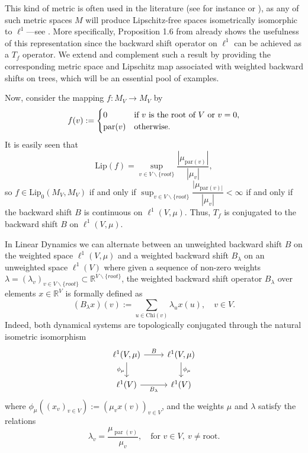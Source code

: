 \documentclass[12pt,english]{amsart}
\numberwithin{equation}{section}
\theoremstyle{plain}
\theoremstyle{definition}
\def\RR{\mathbb{R}}
\def\pare{\text{par}}
\def\chil{\text{Chi}}
\def\lip{ \text{Lip}}
\begin{document}
This kind of metric is often used in the literature (see for instance \cite{ACP21} or \cite{Tap24}), as any of such metric spaces $M$ will produce Lipschitz-free spaces isometrically isomorphic to $\ell^1$---see \cite{God10}. More specifically, Proposition 1.6 from \cite{ACP21} already shows the usefulness of this representation since the backward shift operator on $\ell^1$ can be achieved as a $T_f$ operator. We extend and complement such a result by providing the corresponding metric space and Lipschitz map associated with weighted backward shifts on trees, which will be an essential pool of examples.


Now, consider the mapping $f\colon M_V\to M_V$ by
\begin{align*}
    f(v):=\begin{cases} 
      $0$ & \text{if $v$ is the root of $V$ or $v=0$}, \\
      \pare(v) & \text{otherwise.}
   \end{cases}
\end{align*}
It is easily seen that
\[\lip(f)= \sup_{v\in V\backslash\{root\}} \dfrac{|\mu_{\pare(v)}|}{|\mu_v|} ,\]
so $f\in \lip_0(M_V,M_V)$ if and only if $\sup_{v\in V\backslash\{root\}} \dfrac{|\mu_{\pare(v)|}}{|\mu_v|} <\infty$ if and only if the backward shift $B$ is continuous on $\ell^1(V,\mu)$. Thus, $T_f$ is conjugated to the backward shift $B$ on $\ell^1(V,\mu)$. 

In Linear Dynamics we can alternate between an unweighted backward shift $B$ on the weighted space $\ell^1(V,\mu)$ and  a weighted backward shift $B_\lambda$ on an unweighted space $\ell^1(V)$ where given a sequence of non-zero weights $\lambda=(\lambda_v)_{v\in V\backslash\{root\}}\subset \RR^{V\backslash\{root\}}$, the weighted backward shift operator $B_{\lambda}$ over elements $x\in \RR^V$ is formally defined as 
\[(B_\lambda x)(v):= \sum_{u\in \chil(v)}\lambda_u x(u), \quad  v\in V.\]
Indeed, both dynamical systems are topologically conjugated through the natural isometric isomorphism
\begin{equation*}
\begin{tikzcd}
\ell^1(V,\mu) \arrow[r, "B"] \arrow[d, "\phi_{\mu}"'] & \ell^1(V,\mu) \arrow[d, "\phi_{\mu}"] \\
\ell^1(V) \arrow[r, "B_{\lambda}"'] & \ell^1(V)
\end{tikzcd}
\end{equation*}
where $\phi_\mu((x_v)_{v\in V}):=(\mu_vx(v))_{v\in V}$, and the weights $\mu$ and $\lambda$ satisfy the relations
\[
\lambda_v = \frac{\mu_{\operatorname{par}(v)}}{\mu_v}, \quad \text{for }v \in V, \ v \neq \text{root}.
\]
\end{document}
